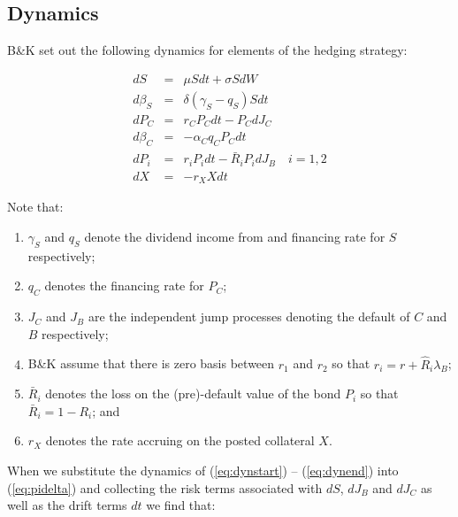 \documentclass{tufte-handout}
\begin{document}
\subsection{Dynamics}\label{sec:dynamics}

B\&K set out the following dynamics for elements of the hedging strategy:

\begin{eqnarray}
  dS       & = & \mu S dt + \sigma S dW \label{eq:dynstart}\\
  d\beta_S & = & \delta (\gamma_S - q_S) S dt \\
  dP_C     & = & r_C P_C dt - P_C dJ_C \\
  d\beta_C & = &  -\alpha_C q_C P_C dt \\
  dP_i     & = & r_i P_i dt - \bar{R}_i P_i dJ_B \quad i = 1, 2\\
  dX       & = & -r_X X dt \label{eq:dynend}
\end{eqnarray}

Note that:

\begin{enumerate}

\item $\gamma_S$ and $q_S$ denote the dividend income from and financing rate
for $S$ respectively;
\item $q_C$ denotes the financing rate for $P_C$;
\item $J_C$ and $J_B$ are the independent jump processes denoting the default
of $C$ and $B$ respectively;
\item B\&K assume that there is zero basis between $r_1$ and $r_2$ so that
$r_i = r + \hat{R}_i\lambda_B$;
\item $\bar{R}_i$ denotes the loss on the (pre)-default value of the bond $P_i$
so that $\bar{R}_i = 1 - R_i$; and
\item $r_X$ denotes the rate accruing on the posted collateral $X$.
\end{enumerate}

When we substitute the dynamics of (\ref{eq:dynstart}) -- (\ref{eq:dynend}) into
(\ref{eq:pidelta}) and collecting the risk terms associated with $dS$, $dJ_B$ and
$dJ_C$ as well as the drift terms $dt$ we find that:
\end{document}
